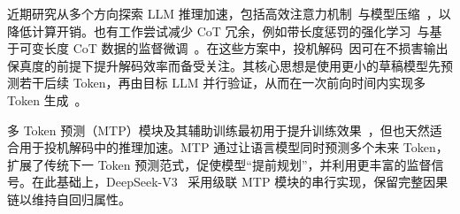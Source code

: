 \documentclass{article} %
\begin{document}

近期研究从多个方向探索 LLM 推理加速，包括高效注意力机制~\citep{katharopoulos2020transformers,child2019generating,yang2024gated,lu2025moba,dao2023flashattention2}与模型压缩~\citep{lin2024awq,xiao2024smoothquant,gu2024minillm,hsieh2023distilling}，以降低计算开销。也有工作尝试减少 CoT 冗余，例如带长度惩罚的强化学习~\citep{luo2025o1pruner,aggarwal2025l1}与基于可变长度 CoT 数据的监督微调~\citep{ma2025cotvalve}。在这些方案中，投机解码~\citep{leviathan2023fast,chen2023accelerating,stern2018blockwise}因可在不损害输出保真度的前提下提升解码效率而备受关注。其核心思想是使用更小的草稿模型先预测若干后续 Token，再由目标 LLM 并行验证，从而在一次前向时间内实现多 Token 生成~\citep{zhou2024survey}。


多 Token 预测（MTP）模块及其辅助训练最初用于提升训练效果~\citep{gloeckle2024better}，但也天然适合用于投机解码中的推理加速。MTP 通过让语言模型同时预测多个未来 Token，扩展了传统下一 Token 预测范式，促使模型“提前规划”，并利用更丰富的监督信号。在此基础上，DeepSeek-V3~\citep{deepseek-ai2024deepseekv3} 采用级联 MTP 模块的串行实现，保留完整因果链以维持自回归属性。
\end{document}
